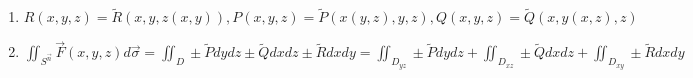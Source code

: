 \documentclass[12pt]{article}
\begin{document}
\begin{enumerate}[label*=\textbf{\arabic** }]
\begin{enumerate}
        \item $R(x, y, z) = \tilde{R}(x, y, z(x, y)), P(x, y, z) = \tilde{P}(x(y, z), y, z), Q(x, y, z) = \tilde{Q}(x, y(x, z), z)$

        \item $\iint_{S^{\overrightarrow{n}}} \vec F(x, y, z) d\vec\sigma = \iint_{D} \pm \tilde{P}dydz \pm \tilde{Q}dxdz \pm \tilde{R}dxdy = \iint_{D_{yz}} \pm \tilde{P}dydz + \iint_{D_{xz}} \pm \tilde{Q}dxdz + \iint_{D_{xy}} \pm \tilde{R}dxdy$
    \end{enumerate}
    \end{enumerate}
\end{document}

